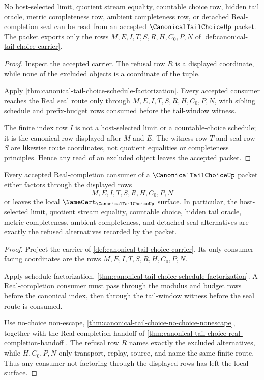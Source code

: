 \begin{theorem}
\label{thm:canonical-tail-choice-no-choice-nonescape}
No host-selected limit, quotient stream equality, countable choice row, hidden tail oracle, metric completeness row, ambient completeness row, or detached Real-completion seal can be read from an accepted $\CanonicalTailChoiceUp$ packet. The packet exports only the rows $M,E,I,T,S,R,H,C_0,P,N$ of \autoref{def:canonical-tail-choice-carrier}.
\end{theorem}
\begin{proof}
Inspect the accepted carrier. The refusal row $R$ is a displayed coordinate, while none of the excluded objects is a coordinate of the tuple.

Apply \autoref{thm:canonical-tail-choice-schedule-factorization}. Every accepted consumer reaches the Real seal route only through $M,E,I,T,S,R,H,C_0,P,N$, with sibling schedule and prefix-budget rows consumed before the tail-window witness.

The finite index row $I$ is not a host-selected limit or a countable-choice schedule; it is the canonical row displayed after $M$ and $E$. The witness row $T$ and seal row $S$ are likewise route coordinates, not quotient equalities or completeness principles. Hence any read of an excluded object leaves the accepted packet.
\end{proof}

\begin{theorem}
\label{thm:canonical-tail-choice-refusal-exhaustion}
Every accepted Real-completion consumer of a $\CanonicalTailChoiceUp$ packet either factors through the displayed rows
$$
M,E,I,T,S,R,H,C_0,P,N
$$
or leaves the local $\NameCert_{\CanonicalTailChoiceUp}$ surface. In particular, the host-selected limit, quotient stream equality, countable choice, hidden tail oracle, metric completeness, ambient completeness, and detached seal alternatives are exactly the refused alternatives recorded by the packet.
\end{theorem}
\begin{proof}
Project the carrier of \autoref{def:canonical-tail-choice-carrier}. Its only consumer-facing coordinates are the rows $M,E,I,T,S,R,H,C_0,P,N$.

Apply schedule factorization, \autoref{thm:canonical-tail-choice-schedule-factorization}. A Real-completion consumer must pass through the modulus and budget rows before the canonical index, then through the tail-window witness before the seal route is consumed.

Use no-choice non-escape, \autoref{thm:canonical-tail-choice-no-choice-nonescape}, together with the Real-completion handoff of \autoref{thm:canonical-tail-choice-real-completion-handoff}. The refusal row $R$ names exactly the excluded alternatives, while $H,C_0,P,N$ only transport, replay, source, and name the same finite route. Thus any consumer not factoring through the displayed rows has left the local surface.
\end{proof}

